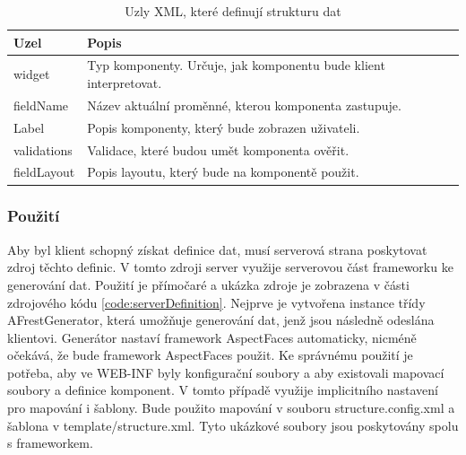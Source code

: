\begin{table}[width=\linewidth]
\begin{center}
\caption{Uzly XML, které definují strukturu dat}
\label{table:xmlComponentAttributes}
\begin{tabular}{|p{7cm}|p{7cm}|}
\hline
\textbf{Uzel} & \textbf{Popis} \\
\hline
widget & 
Typ komponenty. Určuje, jak komponentu bude klient interpretovat. \\
\hline
fieldName &
Název aktuální proměnné, kterou komponenta zastupuje. \\
\hline
Label &
Popis komponenty, který bude zobrazen uživateli. \\
\hline
validations &
Validace, které budou umět komponenta ověřit. \\
\hline
fieldLayout&
Popis layoutu, který bude na komponentě použit. \\
\hline
\end{tabular}
\end{center}
\end{table}

\subsubsection{Použití}
Aby byl klient schopný získat definice dat, musí serverová strana poskytovat zdroj těchto definic. V tomto zdroji server využije serverovou část frameworku ke generování dat. Použití je přímočaré a ukázka zdroje je zobrazena v části zdrojového kódu \ref{code:serverDefinition}. Nejprve je vytvořena instance třídy AFrestGenerator, která umožňuje generování dat, jenž jsou následně odeslána klientovi. Generátor nastaví framework AspectFaces automaticky, nicméně očekává, že bude framework AspectFaces použit. Ke správnému použití je potřeba, aby ve WEB-INF byly konfigurační soubory a aby existovali mapovací soubory a definice komponent. V tomto případě využije implicitního nastavení pro mapování i šablony. Bude použito mapování v souboru structure.config.xml a šablona v template/structure.xml. Tyto ukázkové soubory jsou poskytovány spolu s frameworkem.

